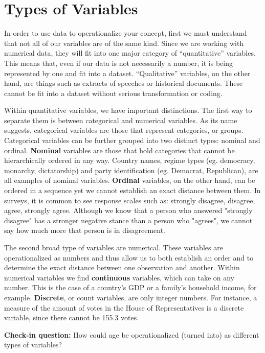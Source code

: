 \documentclass{book}
\newenvironment{shaded*}{
    \begin{center}
    \begin{tabular}{|p{0.9\textwidth}|}
    \hline\\
    }
    { 
    \\\\\hline
    \end{tabular} 
    \end{center}
}
\begin{document}
\hypertarget{types-of-variables}{%
\section{Types of Variables}\label{types-of-variables}}

In order to use data to operationalize your concept, first we must understand
that not all of our variables are of the same kind. Since we are working with
numerical data, they will fit into one major category of ``quantitative''
variables. This means that, even if our data is not necessarily a number, it
is being represented by one and fit into a dataset. ``Qualitative'' variables,
on the other hand, are things such as extracts of speeches or historical
documents. These cannot be fit into a dataset without serious transformation
or coding.

Within quantitative variables, we have important distinctions. The first way
to separate them is between categorical and numerical variables. As its name
suggests, categorical variables are those that represent categories, or
groups. Categorical variables can be further grouped into two distinct types:
nominal and ordinal. \textbf{Nominal} variables are those that hold categories
that cannot be hierarchically ordered in any way. Country names, regime types
(eg. democracy, monarchy, dictatorship) and party identification (eg.
Democrat, Republican), are all examples of nominal variables. \textbf{Ordinal}
variables, on the other hand, can be ordered in a sequence yet we cannot
establish an exact distance between them. In surveys, it is common to see
response scales such as: strongly disagree, disagree, agree, strongly agree.
Although we know that a person who answered "strongly disagree" has a stronger
negative stance than a person who "agrees", we cannot say how much more that
person is in disagreement.

The second broad type of variables are numerical. These variables are
operationalized as numbers and thus allow us to both establish an order and to
determine the exact distance between one observation and another. Within
numerical variables we find \textbf{continuous} variables, which can take on
any number. This is the case of a country's GDP or a family's household
income, for example. \textbf{Discrete}, or count variables, are only integer
numbers. For instance, a measure of the amount of votes in the House of
Representatives is a discrete variable, since there cannot be 155.3 votes.

\begin{shaded*}

\textbf{Check-in question:} How could age be operationalized (turned into) as
different types of variables?

\end{shaded*}
\end{document}

